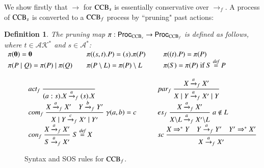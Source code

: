 \documentclass[preprint,12pt]{elsarticle}
\newcommand{\paral}{\; \vert \;}
\newcommand{\Rule}[2]{\displaystyle{\frac{#1}{#2}}}
\newcommand{\Proc}{\mathsf{Proc}}
\newcommand{\tran}[1]{\stackrel{#1}{\rightarrow}}
\newcommand{\mA}{\mathcal{A}}
\newcommand{\mAK}{\mathcal{AK}}
\newcommand{\Nil}{\mathbf{0}}
\newcommand{\bydef}{\stackrel{\emph{def}}{=}}
\newtheorem{definition}{Definition}
\begin{document}
We show firstly that $\rightarrow$ for $\mbox{\rm CCB}_s$ is essentially conservative over 
$\xrightarrow{}_f$.
A process of $\mbox{\rm CCB}_s$ is converted to a $\mbox{\rm CCB}_f$ process by ``pruning" past actions:
\begin{definition}\label{def:pruning} \normalfont The pruning map 
$\pi: \Proc_{{\rm CCB}_s} \rightarrow \Proc_{{\rm CCB}_f}$ is defined as follows, where
$t\in \mAK^*$ and  $s \in \mA^*$:
\\[10pt]
$\begin{array}{lll}
\pi(\Nil)=\Nil \qquad & \pi((s,t).P)=(s).\pi(P) \quad & \pi((t).P)=\pi(P)\\%
\pi(P \paral Q)=\pi(P) \paral \pi(Q) \quad & \pi(P \setminus L)=\pi(P) \setminus L \qquad & \pi(S)=\pi(P)\; \mbox{if }S \bydef P
\end{array}$
\end{definition}
\renewcommand{\arraystretch}{3}
\begin{figure}[t]
\[
\begin{array}{ll}
	\mbox{$act_f$}\
	\Rule
	{}
	{(a:s).X \xrightarrow{a}_f (s).X}
	\qquad &
	\mbox{$par_f$}\
	\Rule
	{X \xrightarrow{a}_f X'}
	{X \paral Y \xrightarrow{a}_f X' \paral Y}
	\\%
	\mbox{$com_f$}\
	\Rule
	{X \xrightarrow{a}_f X' \quad Y \xrightarrow{b}_f Y'}
	{X \paral Y \xrightarrow{c}_f X' \paral Y'}
	\; \gamma(a,b)=c
	\qquad &
	\mbox{$es_f$}\
	\Rule
	{X \xrightarrow{a}_f X'}
	{X\backslash L \xrightarrow{a}_f X'\backslash L}
	\; a \notin L
	\\%
	\mbox{$con_f$}\
	\Rule
	{X \xrightarrow{a}_f X'}
	{S \xrightarrow{a}_f X'}
	\; S \bydef X
	\qquad &
	\mbox{$sc$}\
	\Rule
	{X \Rightarrow^* Y \quad Y \tran{a}_f Y' \quad Y' \Rightarrow^* X'}
	{X\tran{a}_f X'} 
\end{array}
\]
\caption{Syntax and SOS rules for ${\rm CCB}_f$.}\label{fig:ccb-f}
\end{figure}
\renewcommand{\arraystretch}{1}
\end{document}

